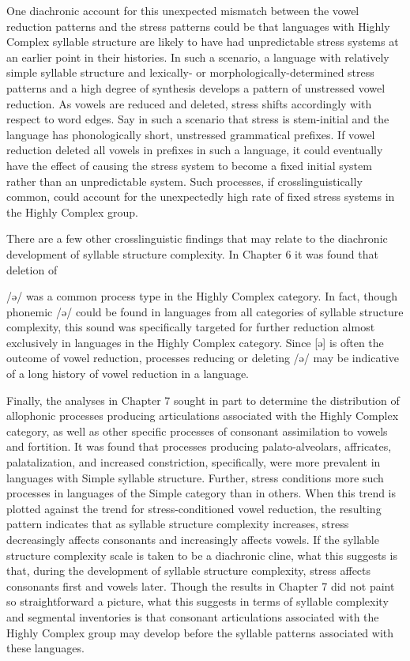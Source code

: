   One diachronic account for this unexpected mismatch between the vowel reduction patterns and the stress patterns could be that languages with Highly Complex syllable structure are likely to have had unpredictable stress systems at an earlier point in their histories. In such a scenario, a language with relatively simple syllable structure and lexically- or morphologically-determined stress patterns and a high degree of synthesis develops a pattern of unstressed vowel reduction. As vowels are reduced and deleted, stress shifts accordingly with respect to word edges. Say in such a scenario that stress is stem-initial and the language has phonologically short, unstressed grammatical prefixes. If vowel reduction deleted all vowels in prefixes in such a language, it could eventually have the effect of causing the stress system to become a fixed initial system rather than an unpredictable system. Such processes, if crosslinguistically common, could account for the unexpectedly high rate of fixed stress systems in the Highly Complex group.

  There are a few other crosslinguistic findings that may relate to the diachronic development of syllable structure complexity. In Chapter 6 it was found that deletion of 

/ə/ was a common process type in the Highly Complex category. In fact, though phonemic /ə/ could be found in languages from all categories of syllable structure complexity, this sound was specifically targeted for further reduction almost exclusively in languages in the Highly Complex category. Since [ə] is often the outcome of vowel reduction, processes reducing or deleting /ə/ may be indicative of a long history of vowel reduction in a language.

  Finally, the analyses in Chapter 7 sought in part to determine the distribution of allophonic processes producing articulations associated with the Highly Complex category, as well as other specific processes of consonant assimilation to vowels and fortition. It was found that processes producing palato-alveolars, affricates, palatalization, and increased constriction, specifically, were more prevalent in languages with Simple syllable structure. Further, stress conditions more such processes in languages of the Simple category than in others. When this trend is plotted against the trend for stress-conditioned vowel reduction, the resulting pattern indicates that as syllable structure complexity increases, stress decreasingly affects consonants and increasingly affects vowels. If the syllable structure complexity scale is taken to be a diachronic cline, what this suggests is that, during the development of syllable structure complexity, stress affects consonants first and vowels later. Though the results in Chapter 7 did not paint so straightforward a picture, what this suggests in terms of syllable complexity and segmental inventories is that consonant articulations associated with the Highly Complex group may develop before the syllable patterns associated with these languages.

